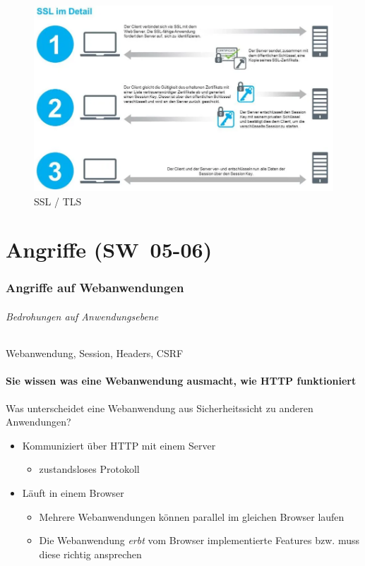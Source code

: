 \documentclass[10pt,a4paper]{article}
\begin{document}
\begin{figure}[H]
    \begin{center}
    \includegraphics[width=13cm]{images/SSL_TLS.png}
    \caption{SSL / TLS}
    \label{SSL / TLS}
    \end{center}
\end{figure}


\pagebreak
\part{Angriffe (SW~05-06)}
\section{Angriffe auf Webanwendungen}

\paragraph*{Bedrohungen auf Anwendungsebene}Webanwendung, Session, Headers, CSRF

\subsection*{Sie wissen was eine Webanwendung ausmacht, wie HTTP funktioniert}
Was unterscheidet eine Webanwendung aus Sicherheitssicht zu anderen Anwendungen?
\begin{itemize}[noitemsep,topsep=0pt,leftmargin=*]
    \item Kommuniziert über HTTP mit einem Server
    \begin{itemize}[noitemsep,topsep=0pt,leftmargin=*]
        \item zustandsloses Protokoll
    \end{itemize}
    \item Läuft in einem Browser
    \begin{itemize}[noitemsep,topsep=0pt,leftmargin=*]
        \item Mehrere Webanwendungen können parallel im gleichen Browser laufen
        \item Die Webanwendung \textsl{erbt} vom Browser implementierte Features
        bzw. muss diese richtig ansprechen
    \end{itemize}
\end{itemize}
\end{document}
